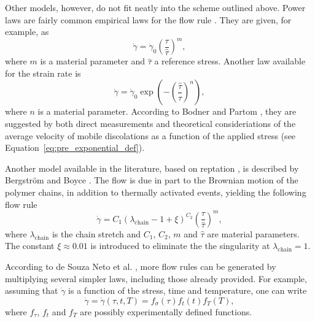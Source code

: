 Other models, however, do not fit neatly into the scheme outlined above.
Power laws are fairly common empirical laws for the flow rule \citep{brownPowerlawCreepEquation1980}.
They are given, for example, as \citep{bergstromMechanicsSolidPolymers2015}
\begin{equation}
	\label{eq:flow_rule_power_law}
	\dot \gamma = \dot \gamma_0 \left(\frac{\tau}{\hat \tau}\right)^m,
\end{equation}
where $m$ is a material parameter and $\hat \tau$ a reference stress.
Another law available for the strain rate is \citep{kellyInfluenceLimitingDislocation1974, bodnerLargeDeformationElasticViscoplastic1972}
\begin{equation}
  \label{eq:exp_flow_law}
	\dot \gamma = \dot \gamma_0 \exp\left(-\left(\frac{\hat \tau}{\tau}\right)^n\right),
\end{equation}
where $n$ is a material parameter.
According to Bodner and Partom \citep{bodnerLargeDeformationElasticViscoplastic1972}, they are suggested by both direct measurements and theoretical consideriations of the average velocity of mobile discolations as a function of the applied stress (see Equation~\eqref{eq:pre_exponential_def}).

Another model available in the literature, based on reptation \citep{doiDynamicsConcentratedPolymer1978a}, is described by Bergström and Boyce \citep{bergstromConstitutiveModelingLarge1998, bergstromConstitutiveModelingTimedependent2001}.
The flow is due in part to the Brownian motion of the polymer chains, in addition to thermally activated events, yielding the following flow rule
\begin{equation}
	\label{eq:bb_reptation_model}
	\dot \gamma = C_1(\lambda_\text{chain} -1 + \xi)^{C_2}\left(\frac{\tau}{\hat\tau}\right)^{m},
\end{equation}
where $\lambda_\text{chain}$ is the chain stretch and $C_1$, $C_2$, $m$ and $\hat \tau$ are material parameters.
The constant $\xi\approx 0.01$ is introduced to eliminate the the singularity at $\lambda_\text{chain}=1$.

According to de Souza Neto et al. \citep{desouzanetoComputationalMethodsPlasticity2008}, more flow rules can be generated by multiplying several simpler laws, including those already provided.
For example, assuming that $\dot \gamma$ is a function of the stress, time and temperature, one can write
\begin{equation}
	\dot \gamma = \dot \gamma(\tau, t, T) = f_\sigma (\tau) f_t(t) f_T(T),
\end{equation}
where $f_\tau$, $f_t$ and $f_T$ are possibly experimentally defined functions.

